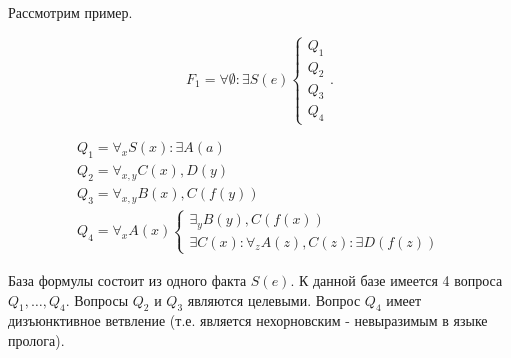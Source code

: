 
%


Рассмотрим пример.

\begin{example}\label{proofexample}


\begin{equation*}\label{ex:f1}
	F_1 = \forall \emptyset\colon \exists S(e)
	\left\lbrace
	\begin{array}{l}
		Q_1 \\
		Q_2 \\
		Q_3 \\
		Q_4
	\end{array}\right..
\end{equation*}

\begin{equation*}
	\begin{array}{l}
	Q_1 = \forall_x S(x)\colon \exists A(a) \\
	Q_2 = \forall_{x,y} C(x),D(y) \\
	Q_3 = \forall_{x,y} B(x),C(f(y)) \\
	Q_4 =
	\forall_x A(x)
	\left\lbrace
	\begin{array}{l}
		\exists_y B(y),C(f(x)) \\
		\exists C(x): \forall_z A(z),C(z)\colon \exists D(f(z))
	\end{array}\right.
	\end{array}
\end{equation*}

База формулы состоит из одного факта $S(e)$. К данной базе имеется 4 вопроса $Q_1,\ldots,Q_4$. Вопросы $Q_2$ и $Q_3$ являются целевыми. Вопрос $Q_4$ имеет дизъюнктивное ветвление (т.е. является нехорновским - невыразимым в языке пролога).


\end{example}
